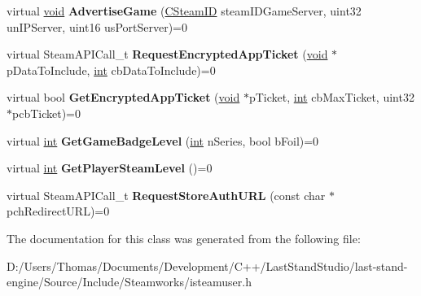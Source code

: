\begin{DoxyCompactItemize}
\item 
\hypertarget{classISteamUser_a07f6db96869e033a13b13e54f7ce2235}{}virtual \hyperlink{SDL__audio_8h_a52835ae37c4bb905b903cbaf5d04b05f}{void} {\bfseries Advertise\+Game} (\hyperlink{classCSteamID}{C\+Steam\+I\+D} steam\+I\+D\+Game\+Server, uint32 un\+I\+P\+Server, uint16 us\+Port\+Server)=0\label{classISteamUser_a07f6db96869e033a13b13e54f7ce2235}

\item 
\hypertarget{classISteamUser_a1ac14d72bff3350b59605826992fc176}{}virtual Steam\+A\+P\+I\+Call\+\_\+t {\bfseries Request\+Encrypted\+App\+Ticket} (\hyperlink{SDL__audio_8h_a52835ae37c4bb905b903cbaf5d04b05f}{void} $\ast$p\+Data\+To\+Include, \hyperlink{SDL__thread_8h_a6a64f9be4433e4de6e2f2f548cf3c08e}{int} cb\+Data\+To\+Include)=0\label{classISteamUser_a1ac14d72bff3350b59605826992fc176}

\item 
\hypertarget{classISteamUser_a4c5ea66df88fd0527d1a51179638d44a}{}virtual bool {\bfseries Get\+Encrypted\+App\+Ticket} (\hyperlink{SDL__audio_8h_a52835ae37c4bb905b903cbaf5d04b05f}{void} $\ast$p\+Ticket, \hyperlink{SDL__thread_8h_a6a64f9be4433e4de6e2f2f548cf3c08e}{int} cb\+Max\+Ticket, uint32 $\ast$pcb\+Ticket)=0\label{classISteamUser_a4c5ea66df88fd0527d1a51179638d44a}

\item 
\hypertarget{classISteamUser_afceb88c7b3241d23d3279650543d5d13}{}virtual \hyperlink{SDL__thread_8h_a6a64f9be4433e4de6e2f2f548cf3c08e}{int} {\bfseries Get\+Game\+Badge\+Level} (\hyperlink{SDL__thread_8h_a6a64f9be4433e4de6e2f2f548cf3c08e}{int} n\+Series, bool b\+Foil)=0\label{classISteamUser_afceb88c7b3241d23d3279650543d5d13}

\item 
\hypertarget{classISteamUser_ae4b393de52cb73b353f8edba83838864}{}virtual \hyperlink{SDL__thread_8h_a6a64f9be4433e4de6e2f2f548cf3c08e}{int} {\bfseries Get\+Player\+Steam\+Level} ()=0\label{classISteamUser_ae4b393de52cb73b353f8edba83838864}

\item 
\hypertarget{classISteamUser_a8e4441998c39deed78c78f14a9ef29b7}{}virtual Steam\+A\+P\+I\+Call\+\_\+t {\bfseries Request\+Store\+Auth\+U\+R\+L} (const char $\ast$pch\+Redirect\+U\+R\+L)=0\label{classISteamUser_a8e4441998c39deed78c78f14a9ef29b7}

\end{DoxyCompactItemize}


The documentation for this class was generated from the following file\+:\begin{DoxyCompactItemize}
\item 
D\+:/\+Users/\+Thomas/\+Documents/\+Development/\+C++/\+Last\+Stand\+Studio/last-\/stand-\/engine/\+Source/\+Include/\+Steamworks/isteamuser.\+h\end{DoxyCompactItemize}
